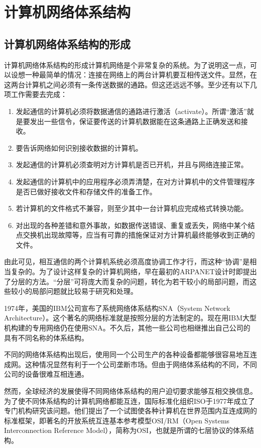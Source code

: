 \section{计算机网络体系结构}

\subsection{计算机网络体系结构的形成}
计算机网络体系结构的形成计算机网络是个非常复杂的系统。为了说明这一点，可以设想一种最简单的情况：连接在网络上的两台计算机要互相传送文件。显然，在这两台计算机之间必须有一条传送数据的通路。但这还远远不够。至少还有以下几项工作需要去完成：
\begin{enumerate}
    \item 发起通信的计算机必须将数据通信的通路进行激活（activate）。所谓“激活”就是要发出一些信令，保证要传送的计算机数据能在这条通路上正确发送和接收。
    \item 要告诉网络如何识别接收数据的计算机。
    \item 发起通信的计算机必须查明对方计算机是否已开机，并且与网络连接正常。
    \item 发起通信的计算机中的应用程序必须弄清楚，在对方计算机中的文件管理程序是否已做好接收文件和存储文件的准备工作。
    \item 若计算机的文件格式不兼容，则至少其中一台计算机应完成格式转换功能。
    \item 对出现的各种差错和意外事故，如数据传送错误、重复或丢失，网络中某个结点交换机出现故障等，应当有可靠的措施保证对方计算机最终能够收到正确的文件。
\end{enumerate}

由此可见，相互通信的两个计算机系统必须高度协调工作才行，而这种“协调”是相当复杂的。为了设计这样复杂的计算机网络，早在最初的ARPANET设计时即提出了分层的方法。“分层”可将庞大而复杂的问题，转化为若干较小的局部问题，而这些较小的局部问题就比较易于研究和处理。

1974年，美国的IBM公司宣布了系统网络体系结构SNA（System Network Architecture）。这个著名的网络标准就是按照分层的方法制定的。现在用IBM大型机构建的专用网络仍在使用SNA。不久后，其他一些公司也相继推出自己公司的具有不同名称的体系结构。

不同的网络体系结构出现后，使用同一个公司生产的各种设备都能够很容易地互连成网。这种情况显然有利于一个公司垄断市场。但由于网络体系结构的不同，不同公司的设备很难互相连通。

然而，全球经济的发展使得不同网络体系结构的用户迫切要求能够互相交换信息。为了使不同体系结构的计算机网络都能互连，国际标准化组织ISO于1977年成立了专门机构研究该问题。他们提出了一个试图使各种计算机在世界范围内互连成网的标准框架，即著名的开放系统互连基本参考模型OSI/RM（Open Systems Interconnection Reference Model），简称为OSI，也就是所谓的七层协议的体系结构。

